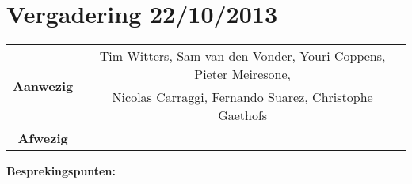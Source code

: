 \section{Vergadering 22/10/2013}

\begin{table}[htbp]
	\centering
	\begin{tabular}{c|c}
		\multirow{2}{*}{\textbf{Aanwezig}} & Tim Witters, Sam van den Vonder, Youri Coppens, Pieter Meiresone, \\
		& Nicolas Carraggi,  Fernando Suarez, Christophe Gaethofs \\
		\hline
		\textbf{Afwezig} &  \\
	\end{tabular}
\end{table}

\noindent \textbf{Besprekingspunten:} \\
